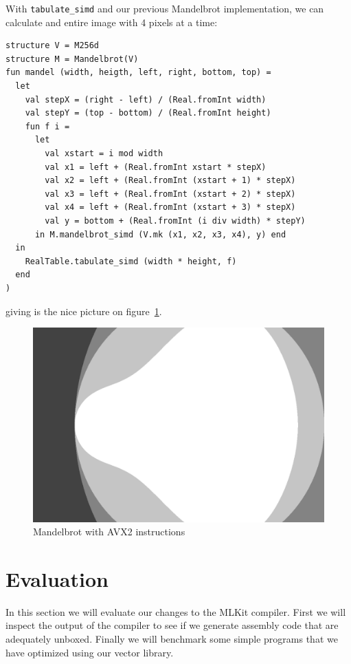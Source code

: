 \documentclass{article}
\begin{document}
With \verb!tabulate_simd! and our previous Mandelbrot implementation, we can calculate and entire image with 4 pixels at a time:
\begin{verbatim}
structure V = M256d
structure M = Mandelbrot(V)
fun mandel (width, heigth, left, right, bottom, top) =
  let
    val stepX = (right - left) / (Real.fromInt width)
    val stepY = (top - bottom) / (Real.fromInt height)
    fun f i =
      let
        val xstart = i mod width
        val x1 = left + (Real.fromInt xstart * stepX)
        val x2 = left + (Real.fromInt (xstart + 1) * stepX)
        val x3 = left + (Real.fromInt (xstart + 2) * stepX)
        val x4 = left + (Real.fromInt (xstart + 3) * stepX)
        val y = bottom + (Real.fromInt (i div width) * stepY)
      in M.mandelbrot_simd (V.mk (x1, x2, x3, x4), y) end
  in
    RealTable.tabulate_simd (width * height, f)
  end
)
\end{verbatim}
giving is the nice picture on figure~\ref{fig:mandel}.
\begin{figure}
    \label{fig:mandel}
    \caption{Mandelbrot with AVX2 instructions}
    \includegraphics[width=\textwidth]{mandel.png}
\end{figure}

\section{Evaluation}
In this section we will evaluate our changes to the MLKit compiler. First we will inspect the output of the compiler to see if we generate assembly code that are adequately unboxed. Finally we will benchmark some simple programs that we have optimized using our vector library.
\end{document}
